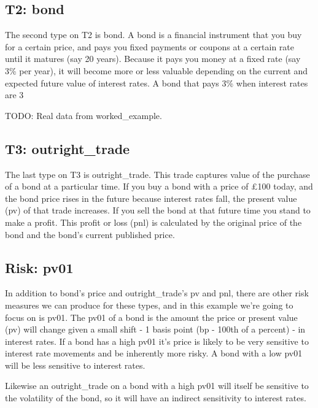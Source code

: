 \documentclass{report}
\begin{document}
\subsection{T2: bond}

The second type on T2 is bond. A bond is a financial instrument that you buy for a certain price, and pays you fixed payments or coupons at a certain rate until it matures (say 20 years). Because it pays you money at a fixed rate (say 3\% per year), it will become more or less valuable depending on the current and expected future value of interest rates. A bond that pays 3\% when interest rates are 3%

TODO: Real data from worked_example.

\subsection{T3: outright_trade}

The last type on T3 is outright_trade. This trade captures value of the purchase of a bond at a particular time. If you buy a bond with a price of £100 today, and the bond price rises in the future because interest rates fall, the present value (pv) of that trade increases. If you sell the bond at that future time you stand to make a profit. This profit or loss (pnl) is calculated by the original price of the bond and the bond's current published price.

\subsection{Risk: pv01}

In addition to bond's price and outright_trade's pv and pnl, there are other risk measures we can produce for these types, and in this example we're going to focus on is pv01. The pv01 of a bond is the amount the price or present value (pv) will change given a small shift - 1 basis point (bp - 100th of a percent) - in interest rates. If a bond has a high pv01 it's price is likely to be very sensitive to interest rate movements and be inherently more risky. A bond with a low pv01 will be less sensitive to interest rates. 

Likewise an outright_trade on a bond with a high pv01 will itself be sensitive to the volatility of the bond, so it will have an indirect sensitivity to interest rates.
\end{document}
